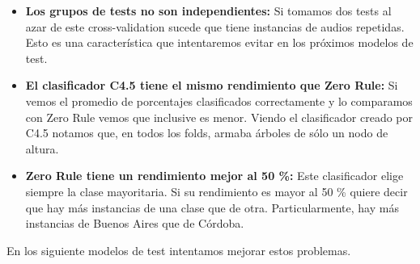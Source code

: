 \begin{itemize}
	\item \textbf{Los grupos de tests no son independientes:} Si tomamos dos tests al azar de este cross-validation sucede que tiene instancias de audios repetidas. Esto es una característica que intentaremos evitar en los próximos modelos de test.
	
	\item \textbf{El clasificador C4.5 tiene el mismo rendimiento que Zero Rule:} Si vemos el promedio de porcentajes clasificados correctamente y lo comparamos con Zero Rule vemos que inclusive es menor. Viendo el clasificador creado por C4.5 notamos que, en todos los folds, armaba árboles de sólo un nodo de altura. 
	
	\item \textbf{Zero Rule tiene un rendimiento mejor al 50 \%: } Este clasificador elige siempre la clase mayoritaria. Si su rendimiento es mayor al 50 \% quiere decir que hay más instancias de una clase que de otra. Particularmente, hay más instancias de Buenos Aires que de Córdoba.
\end{itemize}

En los siguiente modelos de test intentamos mejorar estos problemas.

